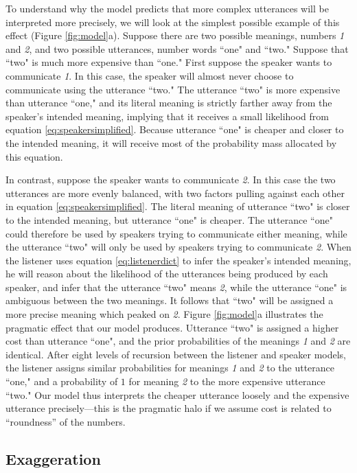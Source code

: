 \documentclass{article} %
\begin{document}
To understand why the model predicts that more complex utterances will be interpreted more precisely, we will look at the simplest possible example of this effect (Figure \ref{fig:model}a). Suppose there are two possible meanings, numbers \emph{1} and \emph{2}, and two possible utterances, number words ``one" and ``two." Suppose that ``two" is much more expensive than ``one." First suppose the speaker wants to communicate \emph{1}. In this case, the speaker will almost never choose to communicate using the utterance ``two." The utterance ``two" is more expensive than utterance ``one," and its literal meaning is strictly farther away from the speaker's intended meaning, implying that it receives a small likelihood from equation \ref{eq:speakersimplified}. Because utterance ``one" is cheaper and closer to the intended meaning, it will receive most of the probability mass allocated by this equation.

In contrast, suppose the speaker wants to communicate \emph{2}. In this case the two utterances are more evenly balanced, with two factors pulling against each other in equation \ref{eq:speakersimplified}. The literal meaning of utterance ``two" is closer to the intended meaning, but utterance ``one" is cheaper. The utterance ``one" could therefore be used by speakers trying to communicate either meaning, while the utterance ``two" will only be used by speakers trying to communicate \emph{2}. When the listener uses equation \ref{eq:listenerdict} to infer the speaker's intended meaning, he will reason about the likelihood of the utterances being produced by each speaker, and infer that the utterance ``two" means \emph{2}, while the utterance ``one"  is ambiguous between the two meanings. It follows that ``two" will be assigned a more precise meaning which peaked on \emph{2}.  Figure \ref{fig:model}a illustrates the pragmatic effect that our model produces. Utterance ``two" is assigned a higher cost than utterance ``one", and the prior probabilities of the meanings \emph{1} and \emph{2} are identical. After eight levels of recursion between the listener and speaker models, the listener assigns similar probabilities for meanings \emph{1} and \emph{2} to the utterance ``one," and a probability of $1$ for meaning \emph{2} to the more expensive utterance ``two." Our model thus interprets the cheaper utterance loosely and the expensive utterance precisely---this is the pragmatic halo if we assume cost is related to ``roundness'' of the numbers.


\subsection{Exaggeration}
\end{document}
